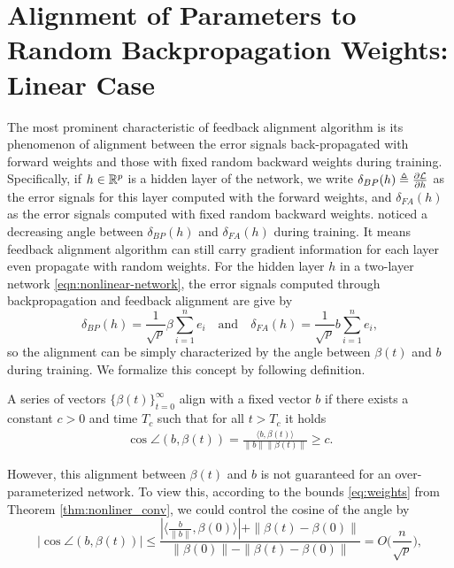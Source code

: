
\section{Alignment of Parameters to Random Backpropagation Weights: Linear Case}\label{sec:alignment}

The most prominent characteristic of feedback alignment algorithm is its phenomenon of alignment between the error signals back-propagated with forward weights and those with fixed random backward weights during training. Specifically, if $h\in \mathbb{R}^p$ is a hidden layer of the network, we write $\delta_{BP}(h) \triangleq \frac{\partial \mathcal{L}}{\partial h}$ as the error signals for this layer computed with the forward weights, and $\delta_{FA}(h)$ as the error signals computed with fixed random backward weights.
\citet{lillicrap2016random} noticed a decreasing angle between $\delta_{BP}(h)$ and $\delta_{FA}(h)$ during training. It means feedback alignment algorithm can still carry gradient information for each layer even propagate with random weights.
For the hidden layer $h$ in a two-layer network \eqref{eqn:nonlinear-network}, the error signals computed through backpropagation and feedback alignment are give by 
\begin{equation}
    \delta_{BP}(h) = \frac{1}{\sqrt{p}}\beta\sum_{i=1}^ne_i \quad\text{and}\quad \delta_{FA}(h) = \frac{1}{\sqrt{p}}b\sum_{i=1}^ne_i,
\end{equation}
so the alignment can be simply characterized by the angle between $\beta(t)$ and $b$ during training. We formalize this concept by following definition.
\begin{definition}\label{def:alignment}
    A series of vectors $\{\beta(t)\}_{t=0}^\infty$ align with a fixed vector $b$ if there exists a constant $c>0$ and time $T_c$ such that for all $t > T_c$ it holds
    \begin{align*}
        \cos\angle(b, \beta(t)) = \frac{\langle b, \beta(t)\rangle}{\|b\|\|\beta(t)\|} \geq c.
    \end{align*}
\end{definition}
However, this alignment between $\beta(t)$ and $b$ is not guaranteed for an over-parameterized network. To view this, according to the bounds \eqref{eq:weights} from Theorem \ref{thm:nonliner_conv}, we could control the cosine of the angle by
\begin{equation}
\Big|\cos\angle(b, \beta(t))\Big| \leq \frac{|\langle \frac{b}{\|b\|}, \beta(0)\rangle|+ \|\beta(t)- \beta(0)\|}{\|\beta(0)\|-\|\beta(t)-\beta(0)\|} = O\big(\frac{n}{\sqrt p}\big),
\end{equation}
